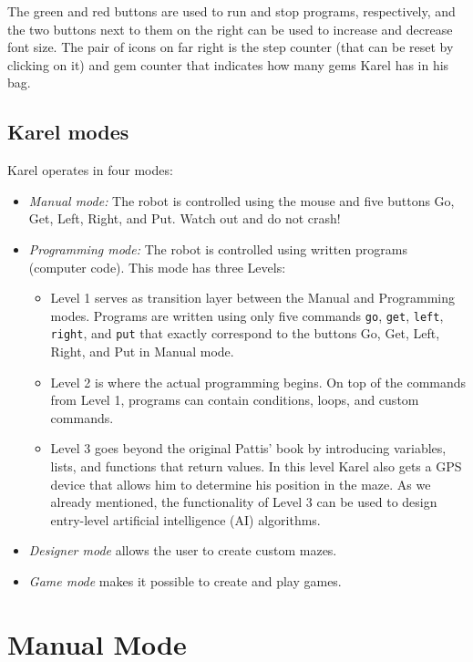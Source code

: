 The green and red 
buttons are used to run and stop programs, respectively, and the two buttons next to them on
the right can be used to increase and decrease font size. The pair of icons on far right is the 
step counter (that can be reset by clicking on it) and gem counter that indicates how many gems 
Karel has in his bag.

\subsection{Karel modes} \label{levels}

Karel operates in four modes:
\begin{itemize}
\item {\em Manual mode:} The robot is controlled using the mouse and five buttons Go, Get, Left, Right, and Put. 
      Watch out and do not crash!
\item {\em Programming mode:} The robot is controlled using written programs (computer code). This mode has 
      three Levels:
\begin{itemize}
\item Level 1 serves as transition layer between the Manual and Programming modes. Programs are written using only 
      five commands {\tt go}, {\tt get}, {\tt left}, {\tt right}, and {\tt put} that exactly correspond to 
      the buttons Go, Get, Left, Right, and Put in Manual mode.
\item Level 2 is where the actual programming begins. On top of the commands from Level 1, programs can contain 
      conditions, loops, and custom commands.
\item Level 3 goes beyond the original Pattis' book by introducing variables, lists, and functions that 
      return values. In this level Karel also gets a GPS device that allows him to determine his position 
      in the maze. As we already mentioned, the functionality of Level 3 can be used to design entry-level artificial 
      intelligence (AI) algorithms. 
\end{itemize}
\item {\em Designer mode} allows the user to create custom mazes.
\item {\em Game mode} makes it possible to create and play games. 
\end{itemize}


\section{Manual Mode} \label{sec:manual}

